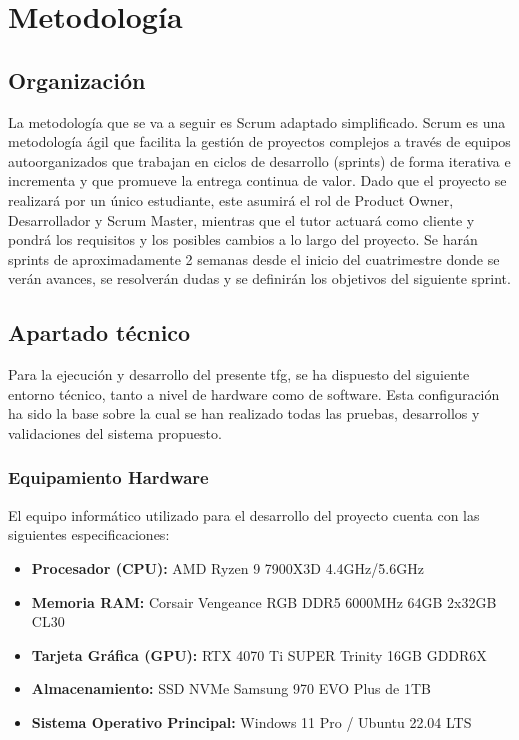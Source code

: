 
\chapter{Metodología}
\label{metodologia}

\section{Organización}

La metodología que se va a seguir es Scrum adaptado simplificado.
Scrum es una metodología ágil que facilita la gestión de proyectos complejos a través de equipos autoorganizados que trabajan en ciclos de desarrollo (sprints) de forma iterativa e incrementa y que promueve la entrega continua de valor.
Dado que el proyecto se realizará por un único estudiante, este asumirá el rol de Product Owner, Desarrollador y Scrum Master, mientras que el tutor actuará como cliente y pondrá los requisitos y los posibles cambios a lo largo del proyecto.
Se harán sprints de aproximadamente 2 semanas desde el inicio del cuatrimestre donde se verán avances, se resolverán dudas y se definirán los objetivos del siguiente sprint.

\section{Apartado técnico}
\label{sec:apartado_tecnico}

Para la ejecución y desarrollo del presente \gls{tfg}, se ha dispuesto del siguiente entorno técnico, tanto a nivel de hardware como de software. Esta configuración ha sido la base sobre la cual se han realizado todas las pruebas, desarrollos y validaciones del sistema propuesto.

\subsection{Equipamiento Hardware}
El equipo informático utilizado para el desarrollo del proyecto cuenta con las siguientes especificaciones:
\begin{itemize}
    \item \textbf{Procesador (CPU):} AMD Ryzen 9 7900X3D 4.4GHz/5.6GHz
    \item \textbf{Memoria RAM:} Corsair Vengeance RGB DDR5 6000MHz 64GB 2x32GB CL30
    \item \textbf{Tarjeta Gráfica (GPU):} RTX 4070 Ti SUPER Trinity 16GB GDDR6X
    \item \textbf{Almacenamiento:} SSD NVMe Samsung 970 EVO Plus de 1TB
    \item \textbf{Sistema Operativo Principal:} Windows 11 Pro / Ubuntu 22.04 LTS
\end{itemize}

